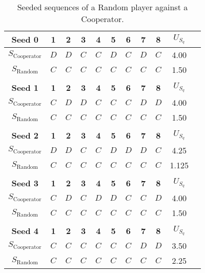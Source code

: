 \documentclass{article}
\begin{document}
\begin{table}[htb]
    \centering
    \begin{tabular}{ccccccccccc}
            \textbf{Seed 0}& \textbf{1} & \textbf{2} & \textbf{3} & \textbf{4}  & \textbf{5} & \textbf{6} & \textbf{7} & \textbf{8} & \(U_{S_q}\) \\ \midrule
            \(S_{\text{Cooperator}}\) & \(D\)&\(D\)&\(C\)&\(C\)&\(D\)&\(C\)&\(D\)&\(C\) & 4.00 \\ [10pt]
            \(S_{\text{Random}}\)     & \(C\)&\(C\)&\(C\)&\(C\)&\(C\)&\(C\)&\(C\)&\(C\) & 1.50 \\ \bottomrule \\
            \textbf{Seed 1}& \textbf{1} & \textbf{2} & \textbf{3} & \textbf{4}  & \textbf{5} & \textbf{6} & \textbf{7} & \textbf{8} & \(U_{S_q}\) \\ \midrule
            \(S_{\text{Cooperator}}\) & \(C\)&\(D\)&\(D\)&\(C\)&\(C\)&\(C\)&\(D\)&\(D\) & 4.00 \\ [10pt]
            \(S_{\text{Random}}\)     & \(C\)&\(C\)&\(C\)&\(C\)&\(C\)&\(C\)&\(C\)&\(C\) & 1.50 \\ \bottomrule \\
            \textbf{Seed 2}& \textbf{1} & \textbf{2} & \textbf{3} & \textbf{4}  & \textbf{5} & \textbf{6} & \textbf{7} & \textbf{8} & \(U_{S_q}\) \\ \midrule
            \(S_{\text{Cooperator}}\) & \(D\)&\(D\)&\(C\)&\(C\)&\(D\)&\(D\)&\(D\)&\(C\) & 4.25 \\ [10pt]
            \(S_{\text{Random}}\)     & \(C\)&\(C\)&\(C\)&\(C\)&\(C\)&\(C\)&\(C\)&\(C\) & 1.125 \\ \bottomrule \\
            \textbf{Seed 3}& \textbf{1} & \textbf{2} & \textbf{3} & \textbf{4}  & \textbf{5} & \textbf{6} & \textbf{7} & \textbf{8} & \(U_{S_q}\) \\ \midrule
            \(S_{\text{Cooperator}}\) & \(C\)&\(D\)&\(C\)&\(D\)&\(D\)&\(C\)&\(C\)&\(D\) & 4.00 \\ [10pt]
            \(S_{\text{Random}}\)     & \(C\)&\(C\)&\(C\)&\(C\)&\(C\)&\(C\)&\(C\)&\(C\) & 1.50 \\ \bottomrule \\
            \textbf{Seed 4}& \textbf{1} & \textbf{2} & \textbf{3} & \textbf{4}  & \textbf{5} & \textbf{6} & \textbf{7} & \textbf{8} & \(U_{S_q}\) \\ \midrule
            \(S_{\text{Cooperator}}\) & \(C\)&\(C\)&\(C\)&\(C\)&\(C\)&\(C\)&\(D\)&\(D\) & 3.50 \\ [10pt]
            \(S_{\text{Random}}\)     & \(C\)&\(C\)&\(C\)&\(C\)&\(C\)&\(C\)&\(C\)&\(C\) & 2.25 \\ \bottomrule
    \end{tabular}
    \caption{Seeded sequences of a Random player against a Cooperator.}\label{table:seeded_example}
\end{table}
\end{document}
